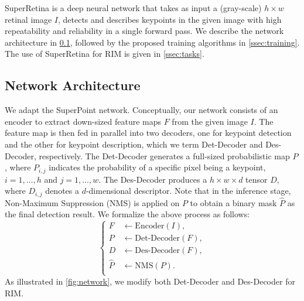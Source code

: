 
SuperRetina is a deep neural network that takes as input a (gray-scale) $h\times w$ retinal image $I$, detects and describes keypoints in the given image with high repeatability and reliability in a single forward pass. We describe the network architecture in  \cref{ssec:network}, followed by the proposed  training algorithms in  \cref{ssec:training}. The use of SuperRetina for RIM is given in \cref{ssec:tasks}.

\subsection{Network Architecture} \label{ssec:network}

We adapt the SuperPoint network. Conceptually, our network consists of an encoder to extract down-sized feature maps $F$ from the given image $I$. The feature map is then fed in parallel into two decoders, one for keypoint detection and the other for keypoint description, which we term Det-Decoder and Des-Decoder, respectively. The Det-Decoder generates a full-sized probabilistic map $P$, where $P_{i,j}$ indicates the probability of a specific pixel being a keypoint, $i=1,\ldots,h$ and $j=1,\ldots,w$. The Des-Decoder produces a $h \times w \times d$ tensor $D$, where $D_{i,j}$ denotes a $d$-dimensional descriptor. Note that in the inference stage, Non-Maximum Suppression (NMS) is applied on $P$ to obtain a binary mask $\widehat{P}$ as the final detection result.  We formalize the above process as follows:
\begin{equation} \label{eq:general}
\left\{ \begin{array}{ll}
 F & \leftarrow \mbox{Encoder}(I), \\
 P & \leftarrow \mbox{Det-Decoder}(F), \\
 D & \leftarrow \mbox{Des-Decoder}(F), \\
 \widehat{P} & \leftarrow \mbox{NMS}(P). \\
\end{array}
\right.
\end{equation}
As illustrated in  \cref{fig:network}, we modify both Det-Decoder and Des-Decoder for RIM.

